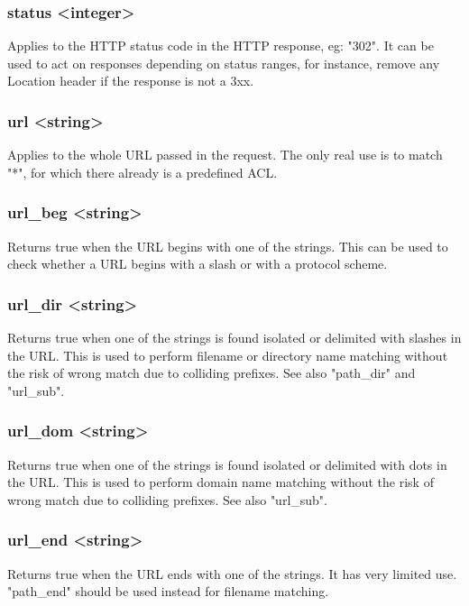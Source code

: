 \subsubsection[status]{status <integer>}
  Applies to the HTTP status code in the HTTP response, eg: "302". It can be
  used to act on responses depending on status ranges, for instance, remove
  any Location header if the response is not a 3xx.

\subsubsection[url]{url <string>}
  Applies to the whole URL passed in the request. The only real use is to match
  "*", for which there already is a predefined ACL.

\subsubsection[url\_beg]{url\_beg <string>}
  Returns true when the URL begins with one of the strings. This can be used to
  check whether a URL begins with a slash or with a protocol scheme.

\subsubsection[url\_dir]{url\_dir <string>}
  Returns true when one of the strings is found isolated or delimited with
  slashes in the URL. This is used to perform filename or directory name
  matching without the risk of wrong match due to colliding prefixes. See also
  "path\_dir" and "url\_sub".

\subsubsection[url\_dom]{url\_dom <string>}
  Returns true when one of the strings is found isolated or delimited with dots
  in the URL. This is used to perform domain name matching without the risk of
  wrong match due to colliding prefixes. See also "url\_sub".

\subsubsection[url\_end]{url\_end <string>}
  Returns true when the URL ends with one of the strings. It has very limited
  use. "path\_end" should be used instead for filename matching.

